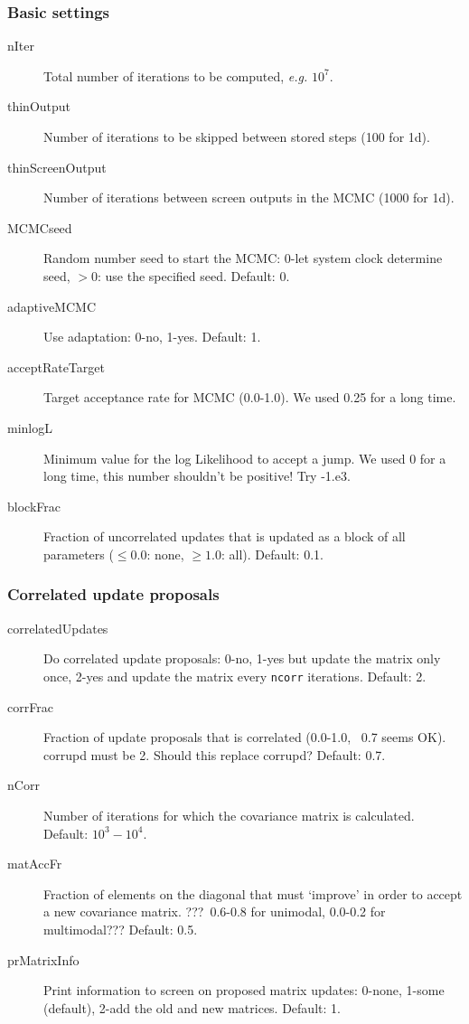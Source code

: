 \documentclass[10pt]{article}
\begin{document}
\subsubsection{Basic settings}
\begin{description}
\item[nIter] Total number of iterations to be computed, \textit{e.g.} $10^7$.
\item[thinOutput] Number of iterations to be skipped between stored steps (100 for 1d).
\item[thinScreenOutput] Number of iterations between screen outputs in the MCMC (1000 for 1d).
\item[MCMCseed] Random number seed to start the MCMC: 0-let system clock determine seed, $>0$: use the specified seed.  Default: 0.
\item[adaptiveMCMC] Use adaptation: 0-no, 1-yes.  Default: 1.
\item[acceptRateTarget] Target acceptance rate for MCMC (0.0-1.0).  We used 0.25 for a long time.
\item[minlogL] Minimum value for the log Likelihood to accept a jump. We used 0 for a long time, this number shouldn't be positive! Try -1.e3.
\item[blockFrac] Fraction of uncorrelated updates that is updated as a block of all parameters ($\leq 0.0$: none, $\geq 1.0$: all).  Default: 0.1.
\end{description}


\subsubsection{Correlated update proposals}
\begin{description}
\item[correlatedUpdates] Do correlated update proposals: 0-no, 1-yes but update the matrix only once, 2-yes and update the matrix every \texttt{ncorr} iterations.  Default: 2.
\item[corrFrac] Fraction of update proposals that is correlated (0.0-1.0, ~0.7 seems OK). corrupd must be 2. Should this replace corrupd?  Default: 0.7.
\item[nCorr] Number of iterations for which the covariance matrix is calculated.  Default: $10^3-10^4$.
\item[matAccFr] Fraction of elements on the diagonal that must `improve' in order to accept a new covariance matrix. ???~0.6-0.8 for unimodal, 0.0-0.2 for multimodal???  Default: 0.5.
\item[prMatrixInfo] Print information to screen on proposed matrix updates: 0-none, 1-some (default), 2-add the old and new matrices.  Default: 1.
\end{description}
\end{document}
